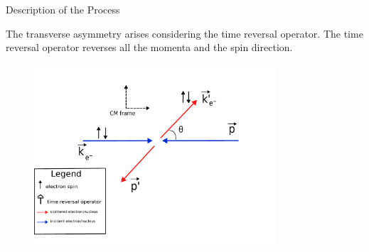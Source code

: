 \documentclass[9pt,a4paper]{beamer}
\begin{document}
\begin{frame}[noframenumbering]{Description of the Process}

The transverse asymmetry arises considering the time reversal operator. The time reversal operator reverses all the momenta and the spin direction.

\begin{figure}[hbtp]
\centering
\includegraphics[width = 0.8\textwidth]{figures/ScatteringScheme.pdf}
\end{figure}
\end{frame}
\end{document}
